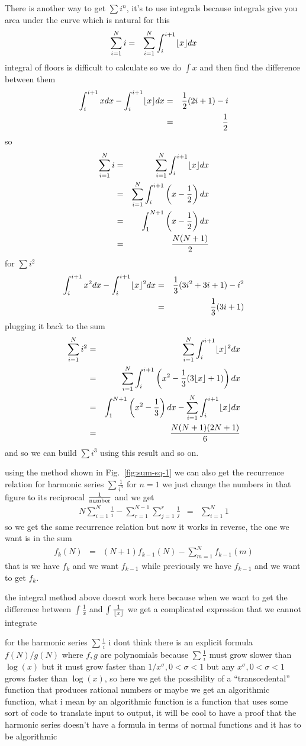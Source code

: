 \documentclass[aps,preprint,preprintnumbers,nofootinbib,showpacs,prd]{revtex4-1}
\newcommand{\nbea}{\begin{eqnarray*}}
\newcommand{\neea}{\end{eqnarray*}}
\DeclarePairedDelimiter{\floor}{\lfloor}{\rfloor}
\begin{document}
There is another way to get $\sum i^n$, it's to use integrals because integrals give you area under the curve which is natural for this
%
\nbea
\sum_{i=1}^N i & = & \sum_{i=1}^N \int_{i}^{i+1} \floor{x} dx 
\neea
%
integral of floors is difficult to calculate so we do $\int x$ and then find the difference between them
%
\nbea
\int_{i}^{i+1} x dx - \int_{i}^{i+1} \floor{x} dx & = & \frac{1}{2} (2i + 1) - i \\
& = & \frac{1}{2}
\neea
%
so 
%
\nbea
\sum_{i=1}^N i & = & \sum_{i=1}^N \int_{i}^{i+1} \floor{x} dx \\
& = & \sum_{i=1}^N \int_{i}^{i+1} \left (x - \frac{1}{2}\right ) dx \\
& = & \int_{1}^{N+1} \left (x - \frac{1}{2}\right ) dx \\
& = & \frac{N(N + 1)}{2}
\neea
%
for $\sum i^2$
%
\nbea
\int_{i}^{i+1} x^2 dx - \int_{i}^{i+1} \floor{x}^2 dx & = & \frac{1}{3} (3i^2 +3i + 1) - i^2 \\
& = & \frac{1}{3}(3i + 1)
\neea
%
plugging it back to the sum
%
\nbea
\sum_{i=1}^N i^2 & = & \sum_{i=1}^N \int_{i}^{i+1} \floor{x}^2 dx \\
& = & \sum_{i=1}^N \int_{i}^{i+1} \left (x^2 - \frac{1}{3}(3\floor{x} + 1)\right ) dx \\
& = & \int_{1}^{N+1} \left (x^2 - \frac{1}{3}\right ) dx - \sum_{i=1}^N \int_{i}^{i+1} \floor{x} dx\\
& = & \frac{N(N+1)(2N+1)}{6}
\neea
%
and so we can build $\sum i^3$ using this result and so on.

using the method shown in Fig.~\ref{fig:sum-sq-1} we can also get the recurrence relation for harmonic series $\sum \frac{1}{i^n}$ for $n=1$ we just change the numbers in that figure to its reciprocal $\frac{1}{\rm number}$ and we get
%
\nbea
N\sum_{i=1}^N \frac{1}{i} - \sum_{r=1}^{N-1} \sum_{j=1}^{r} \frac{1}{j} & = & \sum_{i=1}^{N} 1
\neea
%
so we get the same recurrence relation but now it works in reverse, the one we want is in the sum
%
\nbea
f_k(N) & = & (N+1) f_{k-1}(N) - \sum_{m=1}^{N} f_{k-1}(m)
\neea
%
that is we have $f_k$ and we want $f_{k-1}$ while previously we have $f_{k-1}$ and we want to get $f_k$.

the integral method above doesnt work here because when we want to get the difference between $\int \frac{1}{x}$ and $\int \frac{1}{\floor{x}}$ we get a complicated expression that we cannot integrate 

for the harmonic series $\sum \frac{1}{i}$ i dont think there is an explicit formula $f(N)/g(N)$ where $f, g$ are polynomials because $\sum \frac{1}{i}$ must grow slower than $\log(x)$ but it must grow faster than $1/x^{\sigma}, 0 < \sigma < 1$ but any $x^\sigma,  0 < \sigma < 1$ grows faster than $\log(x)$, so here we get the possibility of a ``transcedental'' function that produces rational numbers or maybe we get an algorithmic function, what i mean by an algorithmic function is a function that uses some sort of code to translate input to output, it will be cool to have a proof that the harmonic series doesn't have a formula in terms of normal functions and it has to be algorithmic 
\end{document}
